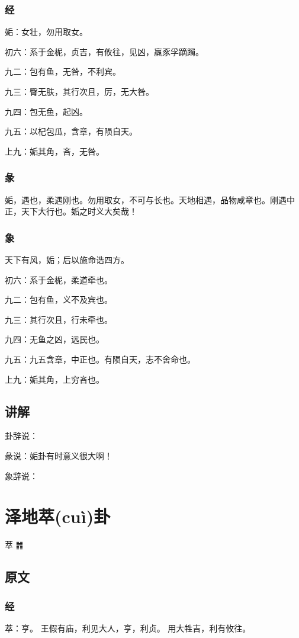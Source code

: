 \documentclass[12pt,oneside]{book}
\begin{document}
\subsection{经}
姤：女壮，勿用取女。

初六：系于金柅，贞吉，有攸往，见凶，羸豕孚蹢躅。

九二：包有鱼，无咎，不利宾。

九三：臀无肤，其行次且，厉，无大咎。

九四：包无鱼，起凶。

九五：以杞包瓜，含章，有陨自天。

上九：姤其角，吝，无咎。


\subsection{彖}
姤，遇也，柔遇刚也。勿用取女，不可与长也。天地相遇，品物咸章也。刚遇中正，天下大行也。姤之时义大矣哉！

\subsection{象}
天下有风，姤；后以施命诰四方。

初六：系于金柅，柔道牵也。

九二：包有鱼，义不及宾也。

九三：其行次且，行未牵也。

九四：无鱼之凶，远民也。

九五：九五含章，中正也。有陨自天，志不舍命也。

上九：姤其角，上穷吝也。


\section{讲解}
卦辞说：

彖说：姤卦有时意义很大啊！

象辞说：


\chapter{泽地萃(cuì)卦}
萃 {\Large ䷬}
\section{原文}

\subsection{经}
萃：亨。 王假有庙，利见大人，亨，利贞。 用大牲吉，利有攸往。
\end{document}
